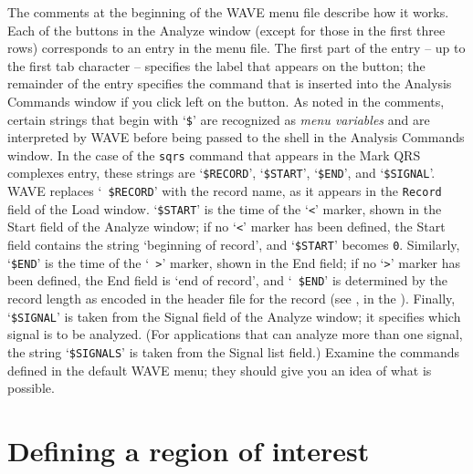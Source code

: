 \documentclass[twoside]{book}
\newcommand{\WAVE}{{\sf WAVE}\xspace}
\begin{document}
The comments at the beginning of the \WAVE{} menu file describe how it
works.  Each of the buttons in the {\sf Analyze} window (except for
those in the first three rows) corresponds to an entry in the menu
file.  The first part of the entry -- up to the first tab character --
specifies the label that appears on the button; the remainder of the
entry specifies the command that is inserted into the {\sf Analysis
Commands} window if you click left on the button.  As noted in the
comments, certain strings that begin with `{\tt \$}' are recognized as
\index{variables!in \WAVE{} menu file}
\emph{menu variables} and are interpreted by \WAVE{} before being
passed to the shell in the {\sf Analysis Commands} window.  In the
case of the {\tt sqrs} command that appears in the {\sf Mark QRS
complexes} entry, these strings are `{\tt \$RECORD}', `{\tt \$START}',
`{\tt \$END}', and `{\tt \$SIGNAL}'.  \WAVE{} replaces `{\tt
\$RECORD}' with the record name, as it appears in the {\tt Record}
field of the {\sf Load} window.  `{\tt \$START}' is the time of the
`{\tt <}' marker, shown in the {\sf Start} field of the {\sf Analyze}
window; if no `{\tt <}' marker has been defined, the {\sf Start} field
contains the string `{\sf beginning of record}', and `{\tt \$START}'
becomes {\tt 0}.  Similarly, `{\tt \$END}' is the time of the `{\tt
>}' marker, shown in the {\sf End} field; if no `{\tt >}' marker has
been defined, the {\sf End} field is `{\sf end of record}', and `{\tt
\$END}' is determined by the record length as encoded in the header
file for the record (see
,
in the
).
Finally, `{\tt \$SIGNAL}' is taken from the
{\sf Signal} field of the {\sf Analyze} window; it specifies which
signal is to be analyzed.
(For applications that can analyze more than one signal,
the string `{\tt \$SIGNALS}' is taken from the {\sf Signal list}
field.)  Examine the commands defined in the default \WAVE{} menu;
they should give you an idea of what is possible.

\section{Defining a region of interest}
\end{document}
